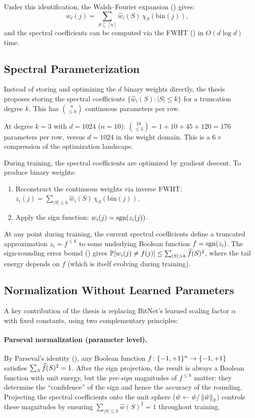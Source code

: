 Under this identification, the Walsh--Fourier expansion
() gives:
\[
  w_i(j) = \sum_{S \subseteq [n]} \widehat{w}_i(S)\, \chi_S(\text{bin}(j)),
\]
and the spectral coefficients can be computed via the FWHT
() in $O(d \log d)$ time.

\subsection{Spectral Parameterization}\label{sec:spectral-param}

Instead of storing and optimizing the $d$ binary weights directly, the
thesis proposes storing the spectral coefficients
$\{\widehat{w}_i(S) : |S| \leq k\}$ for a truncation degree $k$. This
has $\binom{n}{\leq k}$ continuous parameters per row.

At degree $k = 3$ with $d = 1024$ ($n = 10$):
$\binom{10}{\leq 3} = 1 + 10 + 45 + 120 = 176$ parameters per row,
versus $d = 1024$ in the weight domain. This is a $6\times$ compression
of the optimization landscape.

During training, the spectral coefficients are optimized by gradient
descent. To produce binary weights:
\begin{enumerate}
  \item Reconstruct the continuous weights via inverse FWHT:
    $z_i(j) = \sum_{|S| \leq k} \widehat{w}_i(S)\, \chi_S(\text{bin}(j))$.
  \item Apply the sign function: $w_i(j) = \operatorname{sgn}(z_i(j))$.
\end{enumerate}

At any point during training, the current spectral coefficients define a
truncated approximation $z_i = f^{\leq k}$ to some underlying Boolean
function $f = \operatorname{sgn}(z_i)$. The sign-rounding error bound
() gives
$\Prob[w_i(j) \neq f(j)] \leq \sum_{|S|>k} \fhat(S)^2$, where the
tail energy depends on $f$ (which is itself evolving during training).

\subsection{Normalization Without Learned Parameters}\label{sec:normalization}

A key contribution of the thesis is replacing BitNet's learned scaling
factor $\alpha$ with fixed constants, using two complementary
principles:

\paragraph{Parseval normalization (parameter level).}
By Parseval's identity (), any Boolean function
$f \colon \{-1,+1\}^n \to \{-1,+1\}$ satisfies $\sum_S \widehat{f}(S)^2 = 1$.
After the sign projection, the result is always a Boolean function
with unit energy, but the \emph{pre-sign} magnitudes of $f^{\leq k}$
matter: they determine the ``confidence'' of the sign and hence the
accuracy of the rounding. Projecting the spectral coefficients onto the
unit sphere ($\hat{w} \leftarrow \hat{w} / \left\| \hat{w} \right\|_2$) controls
these magnitudes by ensuring $\sum_{|S| \leq k} \hat{w}(S)^2 = 1$
throughout training.

